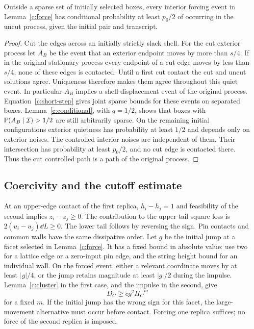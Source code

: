 \begin{lemma}[Insulation]\label{c:insulation}
Outside a sparse set of initially selected boxes, every interior forcing
event in Lemma~\ref{c:force} has conditional probability at least $p_0/2$
of occurring in the uncut process, given the initial pair and transcript.
\end{lemma}
\begin{proof}
Cut the edges across an initially strictly slack shell. For the cut
exterior process let $A_B$ be the event that an exterior endpoint moves
by more than $s/4$. If in the original stationary process every endpoint
of a cut edge moves by less than $s/4$, none of these edges is contacted.
Until a first cut contact the cut and uncut solutions agree. Uniqueness
therefore makes them agree throughout this quiet event. In particular
$A_B$ implies a shell-displacement event of the original process.
Equation~\eqref{c:short-step} gives joint sparse bounds for these events
on separated boxes. Lemma~\ref{c:conditional}, with $q=1/2$, shows that
boxes with $\mathbb P(A_B\mid\mathcal I)>1/2$ are still arbitrarily sparse.
On the remaining initial configurations exterior quietness has
probability at least $1/2$ and depends only on exterior noises. The
controlled interior noises are independent of them. Their intersection
has probability at least $p_0/2$, and no cut edge is contacted there.
Thus the cut controlled path is a path of the original process.
\end{proof}

\subsection{Coercivity and the cutoff estimate}

At an upper-edge contact of the first replica, $h_i-h_j=1$ and feasibility
of the second implies $z_i-z_j\ge0$. The contribution to the upper-tail
square loss is $2(u_i-u_j)\dd L\ge0$. The lower tail follows by reversing
the sign. Pin contacts and common walls have the same dissipative order.
Let $g$ be the initial jump at a facet selected in Lemma~\ref{c:force}.
It has a fixed bound in absolute value: use two for a lattice edge or
a zero-input pin edge, and the string height bound for an individual
wall. On the forced event, either a relevant coordinate moves by
at least $|g|/4$, or the jump retains magnitude at least $|g|/2$
during the impulse. Lemma~\ref{c:cluster} in the first case, and the
impulse in the second, give
\begin{equation}\label{c:force-loss}
 D_C\ge c g^2 H_C^{-m}
\end{equation}
for a fixed $m$. If the initial jump has the wrong sign for this facet,
the large-movement alternative must occur before contact. Forcing one
replica suffices; no force of the second replica is imposed.

